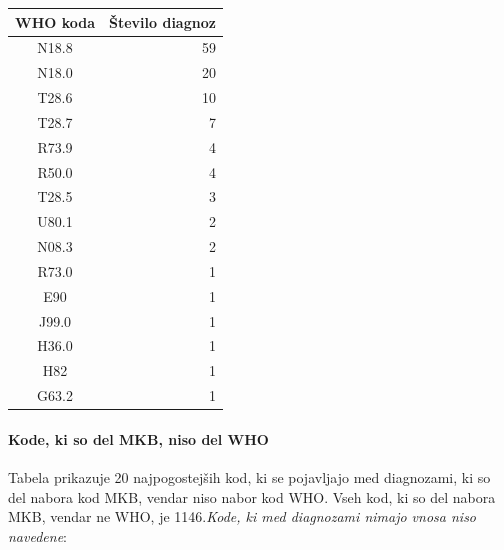 \documentclass[a4paper,12pt]{report}
\begin{document}
\begin{center}
   \begin{tabular}{||c|r||}
      \hline
      WHO koda & Število diagnoz\\
      \hline
      \hline
      N18.8 & 59\\
      N18.0 & 20\\
      T28.6 & 10\\
      T28.7 & 7\\
      R73.9 & 4\\
      R50.0 & 4\\
      T28.5 & 3\\
      U80.1 & 2\\
      N08.3 & 2\\
      R73.0 & 1\\
      E90 & 1\\
      J99.0 & 1\\
      H36.0 & 1\\
      H82 & 1\\
      G63.2 & 1\\
      \hline

   \end{tabular}
\end{center}

\pagebreak
\paragraph{Kode, ki so del MKB, niso del WHO}
Tabela prikazuje 20 najpogostejših kod, ki se pojavljajo med diagnozami, ki so del nabora kod MKB, vendar niso nabor kod WHO. 
Vseh kod, ki so del nabora MKB, vendar ne WHO, je 1146.\textit{Kode, ki med diagnozami nimajo vnosa niso navedene}:
\end{document}
